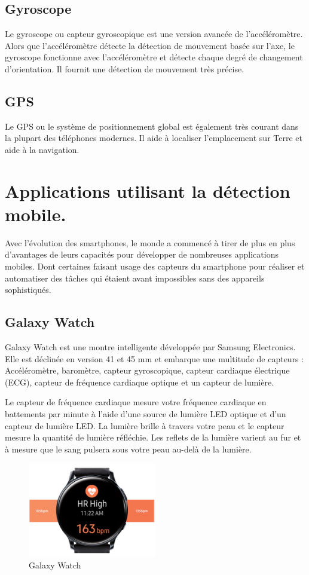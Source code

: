 \subsection{Gyroscope}
Le gyroscope ou capteur gyroscopique est une version avancée de l'accéléromètre. Alors que l'accéléromètre détecte la détection de mouvement basée sur l'axe, le gyroscope fonctionne avec l'accéléromètre et détecte chaque degré de changement d'orientation. Il fournit une détection de mouvement très précise.

\subsection{GPS}
Le GPS ou le système de positionnement global est également très courant dans la plupart des téléphones modernes. Il aide à localiser l'emplacement sur Terre et aide à la navigation.

\section{Applications utilisant la détection mobile.}
Avec l'évolution des smartphones, le monde a commencé à tirer de plus en plus d'avantages de leurs capacités pour développer de nombreuses applications mobiles. Dont certaines faisant usage des capteurs du smartphone pour réaliser et automatiser des tâches qui étaient avant impossibles sans des appareils sophistiqués.
\subsection{Galaxy Watch}
Galaxy Watch est une montre intelligente développée par Samsung Electronics. Elle est déclinée en version 41 et 45 mm et embarque une multitude de capteurs : Accéléromètre, baromètre, capteur gyroscopique, capteur cardiaque électrique (ECG), capteur de fréquence cardiaque optique et un capteur de lumière.

Le capteur de fréquence cardiaque mesure votre fréquence cardiaque en battements par minute à l'aide d'une source de lumière LED optique et d'un capteur de lumière LED. La lumière brille à travers votre peau et le capteur mesure la quantité de lumière réfléchie. Les reflets de la lumière varient au fur et à mesure que le sang pulsera sous votre peau au-delà de la lumière.
\begin{figure}[h!]
    \center
    \includegraphics[width=0.5\textwidth]{Images/chapter1/galaxyWatch.PNG}
    \caption{Galaxy Watch}
    \label{fig:Application}
\end{figure}
